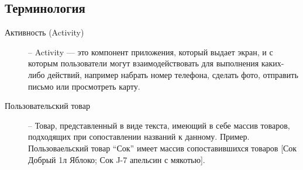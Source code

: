 \subsection{Терминология}
\begin{description}
    \item[Активность (Activity)] --
        Activity — это компонент приложения, который выдает экран, и с которым
        пользователи могут взаимодействовать для выполнения каких-либо
        действий, например набрать номер телефона, сделать фото, отправить
        письмо или просмотреть карту. 

    \item[Пользовательский товар] --
            Товар, представленный в виде текста, имеющий в себе массив товаров,
            подходящих при сопоставлении названий к данному. Пример.
            Пользоваельский товар ``Сок'' имеет массив сопоставившихся товаров [Сок
            Добрый 1л Яблоко; Сок J-7 апельсин с мякотью].

\end{description}


